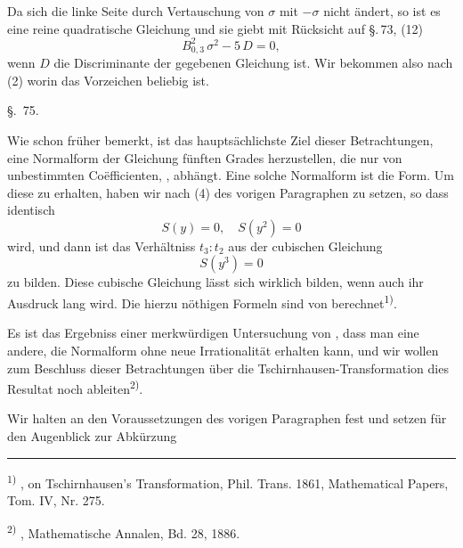 
Da sich die linke Seite durch Vertauschung von $\sigma$ mit $-\sigma$ nicht \"andert, so ist es eine reine quadratische Gleichung und sie giebt mit R\"ucksicht auf \S.\,73, (12)
\[
B_{0,3}^2\,\sigma^2 - 5\,D = 0,
\]
wenn $D$ die Discriminante der gegebenen Gleichung ist. Wir bekommen also nach (2)
worin das Vorzeichen beliebig ist.

\begin{center}
\S.\ 75.

\end{center}

Wie schon fr\"uher bemerkt, ist das haupts\"achlichste Ziel dieser Betrachtungen, eine Normalform der Gleichung f\"unften Grades herzustellen, die nur von  unbestimmten Co\"efficienten, , abh\"angt. Eine solche Normalform ist die  Form. Um diese zu erhalten, haben wir nach (4) des vorigen Paragraphen
zu setzen, so dass identisch
\[
S(y) = 0, \quad S(y^2) = 0
\]
wird, und dann ist das Verh\"altniss $t_3 : t_2$ aus der cubischen Gleichung
\[
S(y^3) = 0
\]
zu bilden. Diese cubische Gleichung l\"asst sich wirklich bilden, wenn auch ihr Ausdruck lang wird. Die hierzu n\"othigen Formeln sind von  berechnet\textsuperscript{1)}.

Es ist das Ergebniss einer merkw\"urdigen Untersuchung von , dass man eine andere, die  Normalform ohne neue Irrationalit\"at erhalten kann, und wir wollen zum Beschluss dieser Betrachtungen \"uber die Tschirnhausen-Transformation dies Resultat noch ableiten\textsuperscript{2)}.

Wir halten an den Voraussetzungen des vorigen Paragraphen fest und setzen f\"ur den Augenblick zur Abk\"urzung

\bigskip
\noindent\rule{4cm}{0.4pt}

\noindent\textsuperscript{1)} , on Tschirnhausen's Transformation, Phil. Trans. 1861, Mathematical Papers, Tom. IV, Nr. 275.

\noindent\textsuperscript{2)} , Mathematische Annalen, Bd. 28, 1886.
